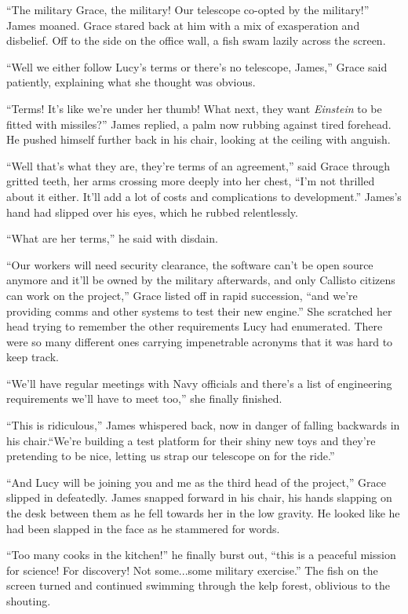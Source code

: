 \documentclass[12pt]{article} %
\begin{document}
``The military Grace, the military! Our telescope co-opted by the military!'' James moaned. Grace stared back at him with a mix of exasperation and disbelief. Off to the side on the office wall, a fish swam lazily across the screen.

``Well we either follow Lucy's terms or there's no telescope, James,'' Grace said patiently, explaining what she thought was obvious.

``Terms! It's like we're under her thumb! What next, they want \textit{Einstein} to be fitted with missiles?'' James replied, a palm now rubbing against tired forehead. He pushed himself further back in his chair, looking at the ceiling with anguish.

``Well that's what they are, they're terms of an agreement,'' said Grace through gritted teeth, her arms crossing more deeply into her chest, ``I'm not thrilled about it either. It'll add a lot of costs and complications to development.'' James's hand had slipped over his eyes, which he rubbed relentlessly.

``What are her terms,'' he said with disdain.

``Our workers will need security clearance, the software can't be open source anymore and it'll be owned by the military afterwards, and only Callisto citizens can work on the project,'' Grace listed off in rapid succession, ``and we're providing comms and other systems to test their new engine.'' She scratched her head trying to remember the other requirements Lucy had enumerated. There were so many different ones carrying impenetrable acronyms that it was hard to keep track.

``We'll have regular meetings with Navy officials and there's a list of engineering requirements we'll have to meet too,'' she finally finished. 

``This is ridiculous,'' James whispered back, now in danger of falling backwards in his chair.``We're building a test platform for their shiny new toys and they're pretending to be nice, letting us strap our telescope on for the ride.''

``And Lucy will be joining you and me as the third head of the project,'' Grace slipped in defeatedly. James snapped forward in his chair, his hands slapping on the desk between them as he fell towards her in the low gravity. He looked like he had been slapped in the face as he stammered for words.

``Too many cooks in the kitchen!'' he finally burst out, ``this is a peaceful mission for science! For discovery! Not some...some military exercise.'' The fish on the screen turned and continued swimming through the kelp forest, oblivious to the shouting. 
\end{document}
